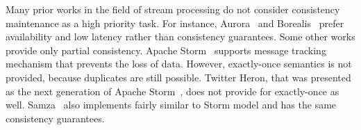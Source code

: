 
\label {fs-related-seciton}

Many prior works in the field of stream processing do not consider consistency maintenance as a high priority task. For instance, Aurora~\cite{Abadi:2003:ANM:950481.950485} and Borealis~\cite{abadi2005design} prefer availability and low latency rather than consistency guarantees. Some other works provide only partial consistency. Apache Storm~\cite{apache:storm} supports message tracking mechanism that prevents the loss of data. However, exactly-once semantics is not provided, because duplicates are still possible. Twitter Heron, that was presented as the next generation of Apache Storm~\cite{Kulkarni:2015:THS:2723372.2742788}, does not provide for exactly-once as well. Samza~\cite{Noghabi:2017:SSS:3137765.3137770} also implements fairly similar to Storm model and has the same consistency guarantees.  



